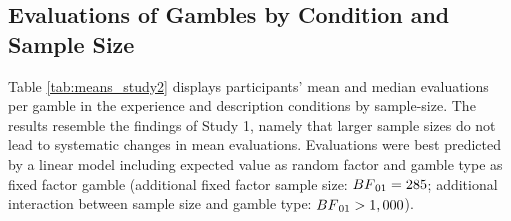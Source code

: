 \documentclass[a4paper, man, floatsintext]{apa6}
\title{}
\author{Jana B. Jarecki}
\date{01 November, 2019}
\begin{document}
\subsection{Evaluations of Gambles by Condition and Sample Size}

Table \ref{tab:means_study2} displays participants' mean and median
evaluations per gamble in the experience and description conditions by
sample-size. The results resemble the findings of Study 1, namely that
larger sample sizes do not lead to systematic changes in mean
evaluations. Evaluations were best predicted by a linear model including
expected value as random factor and gamble type as fixed factor gamble
(additional fixed factor sample size: \(BF\textsubscript{01} = 285\);
additional interaction between sample size and gamble type:
\(BF\textsubscript{01} > 1,000\)).
\end{document}
